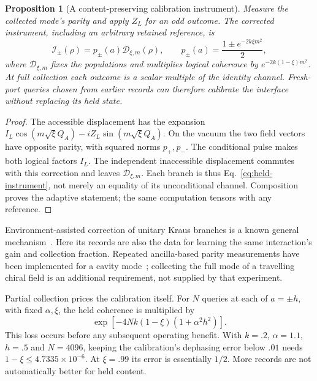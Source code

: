 \documentclass[aps,pre,onecolumn,superscriptaddress,floatfix,longbibliography]{revtex4-2}
\newtheorem{proposition}[theorem]{Proposition}
\begin{document}
\begin{proposition}[A content-preserving calibration instrument]
\label{prop:held-instrument}
Measure the collected mode's parity and apply $Z_L$ for an odd outcome.
The corrected instrument, including an arbitrary retained reference, is
\begin{equation}
 \mathcal I_\pm(\rho)=p_\pm(a)\mathcal D_{\xi,m}(\rho),\qquad
 p_\pm(a)=\frac{1\pm e^{-2k\xi m^2}}2,
 \label{eq:held-instrument}
\end{equation}
where $\mathcal D_{\xi,m}$ fixes the populations and multiplies logical
coherence by $e^{-2k(1-\xi)m^2}$. At full collection each outcome is a
scalar multiple of the identity channel. Fresh-port queries chosen from earlier
records can therefore calibrate the interface without replacing its held state.
\end{proposition}
\begin{proof}
The accessible displacement has the expansion
$I_L\cos(m\sqrt\xi Q_A)-iZ_L\sin(m\sqrt\xi Q_A)$.
On the vacuum the two field vectors have opposite parity, with squared norms
$p_+,p_-$. The conditional pulse makes both logical factors $I_L$.
The independent inaccessible displacement commutes with this correction and
leaves $\mathcal D_{\xi,m}$. Each branch is thus Eq.~\eqref{eq:held-instrument},
not merely an equality of its unconditional channel. Composition proves the
adaptive statement; the same computation tensors with any reference.
\end{proof}

Environment-assisted correction of unitary Kraus branches is a known general
mechanism~\cite[Proposition~2]{GregorattiWerner2002}. Here its records are also
the data for learning the same interaction's gain and collection fraction.
Repeated ancilla-based parity measurements have been implemented for a cavity
mode~\cite{Sun2013}; collecting the full mode of a travelling chiral field is
an additional requirement, not supplied by that experiment.

Partial collection prices the calibration itself. For $N$ queries at each of
$a=\pm h$, with fixed $\alpha,\xi$, the held coherence is multiplied by
\begin{equation}
 \exp[-4Nk(1-\xi)(1+\alpha^2h^2)].
 \label{eq:calibration-disturbance}
\end{equation}
This loss occurs before any subsequent operating benefit. With $k=.2$,
$\alpha=1.1$, $h=.5$ and $N=4096$, keeping the calibration's dephasing error
below $.01$ needs $1-\xi\le4.7335\times10^{-6}$. At $\xi=.99$ its error
is essentially $1/2$. More records are not automatically better for held content.
\end{document}
